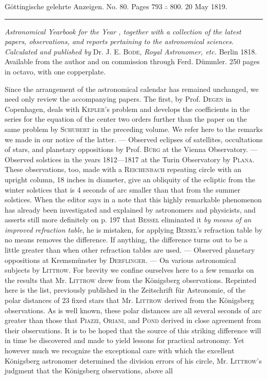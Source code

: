 \clearpage
{}
\hypertarget{native-616-lower}{}
\begin{center}\small Göttingische gelehrte Anzeigen. No. 80. Pages $793\;\therefore\;800$. 20 May 1819.\\[3pt]\rule{.72\linewidth}{.3pt}\end{center}

\emph{Astronomical Yearbook for the Year {}, together with a collection of the latest papers, observations, and reports pertaining to the astronomical sciences. Calculated and published by} Dr. J. E. \textsc{Bode}, \emph{Royal Astronomer, etc.} Berlin 1818. Available from the author and on commission through Ferd. Dümmler. 250 pages in octavo, with one copperplate.

\begingroup{}\relax
Since the arrangement of the astronomical calendar has remained unchanged, we need only review the accompanying papers. The first, by Prof. \textsc{Degen} in Copenhagen, deals with \textsc{Kepler}'s problem and develops the coefficients in the series for the equation of the center two orders further than the paper on the same problem by \textsc{Schubert} in the preceding volume. We refer here to the remarks we made in our notice of the latter. --- Observed eclipses of satellites, occultations of stars, and planetary oppositions by Prof. \textsc{Bürg} at the Vienna Observatory. --- Observed solstices in the years 1812---1817 at the Turin Observatory by \textsc{Plana}. These observations, too, made with a \textsc{Reichenbach} repeating circle with an upright column, 18 inches in diameter, give an obliquity of the ecliptic from the winter solstices that is 4 seconds of arc smaller than that from the summer solstices. When the editor says in a note that this highly remarkable phenomenon has already been investigated and explained by astronomers and physicists, and asserts still more definitely on p. 197 that \textsc{Bessel} eliminated it \emph{by means of an improved refraction table}, he is mistaken, for applying \textsc{Bessel}'s refraction table by no means removes the difference. If anything, the difference turns out to be a little greater than when other refraction tables are used. --- Observed planetary oppositions at Kremsmünster by \textsc{Derflinger}. --- On various astronomical subjects by \textsc{Littrow}. For brevity we confine ourselves here to a few remarks on the results that Mr. \textsc{Littrow} drew from the Königsberg observations. Reprinted here is the list, previously published in the Zeitschrift für Astronomie, of the polar distances of 23 fixed stars that Mr. \textsc{Littrow} derived from the Königsberg observations. As is well known, these polar distances are all several seconds of arc greater than those that \textsc{Piazzi}, \textsc{Oriani}, and \textsc{Pond} derived in close agreement from their observations. It is to be hoped that the source of this striking difference will in time be discovered and made to yield lessons for practical astronomy. Yet however much we recognize the exceptional care with which the excellent Königsberg astronomer determined the division errors of his circle, Mr. \textsc{Littrow}'s judgment that the Königsberg observations, above all 